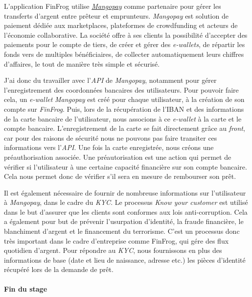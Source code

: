 L'application FinFrog utilise
\href{https://www.mangopay.com/fr/}{\emph{Mangopay}} comme partenaire
pour gérer les transferts d'argent entre prêteur et emprunteurs.
\emph{Mangopay} est solution de paiement dédiée aux marketplaces,
plateformes de crowdfunding et acteurs de l'économie collaborative. La
société offre à ses clients la possibilité d'accepter des paiements pour
le compte de tiers, de créer et gérer des \emph{e-wallets}, de répartir
les fonds vers de multiples bénéficiaires, de collecter automatiquement
leurs chiffres d'affaires, le tout de manière très simple et sécurisé.

\bigskip

J'ai donc du travailler avec l'\emph{API} de \emph{Mangopay}, notamment
pour gérer l'enregistrement des coordonnées bancaires des utilisateurs.
Pour pouvoir faire cela, un \emph{e-wallet} \emph{Mangopay} est créé
pour chaque utilisateur, à la création de son compte sur \emph{FinFrog}.
Puis, lors de la récupération de l'IBAN et des informations de la carte
bancaire de l'utilisateur, nous associons à ce \emph{e-wallet} à la
carte et le compte bancaire. L'enregistrement de la carte se fait
directement grâce au \emph{front}, car pour des raisons de sécurité nous
ne pouvons pas faire transiter ces informations vers l'\emph{API}. Une
fois la carte enregistrée, nous créons une préauthorisation associée.
Une préautorisation est une action qui permet de vérifier si
l'utilisateur à une certaine capacité financière sur son compte
bancaire. Cela nous permet donc de vérifier s'il sera en mesure de
rembourser son prêt.

\bigskip

Il est également nécessaire de fournir de nombreuse informations sur
l'utilisateur à \emph{Mangopay}, dans le cadre du \emph{KYC}. Le
processus \emph{Know your customer} est utilisé dans le but d'assurer
que les clients sont conformes aux lois anti-corruption. Cela a
également pour but de prévenir l'usurpation d'identité, la fraude
financière, le blanchiment d'argent et le financement du terrorisme.
C'est un processus donc très important dans le cadre d'entreprise comme
FinFrog, qui gére des flux quotidien d'argent. Pour répondre au
\emph{KYC}, nous fournissons en plus des informations de base (date et
lieu de naissance, adresse etc.) les pièces d'identité récupéré lors de
la demande de prêt.

\bigskip

\paragraph{Fin du stage}\label{fin-du-stage}

